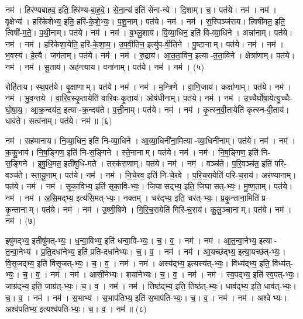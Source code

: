नम॑। हिर॑ण्यबाहव॒ इति॒ हिर॑ण्य-बा॒ह॒वे॒। से॒ना॒न्य॑ इति॑ सेना-न्ये। दि॒शाम्। च॒। पत॑ये। नम॑। 
नम॑। वृ॒क्षेभ्य॑। हरि॑केशेभ्य॒ इति॒ हरि॑-के॒शे॒भ्यः॒। प॒शू॒नाम्। पत॑ये। नम॑। 
नम॑। स॒स्पिञ्ज॑राय। त्विषी॑मत॒ इति॒ त्विषी॑-म॒ते॒। प॒थी॒नाम्। पत॑ये। नम॑। 
नम॑। ब॒भ्लु॒शाय॑। वि॒व्या॒धिन॒ इति॑ वि-व्या॒धिने। अन्ना॑नाम्। पत॑ये। नम॑। 
नम॑। हरि॑केशा॒येति॒ हरि॑-के॒शा॒य॒। उ॒प॒वी॒तिन॒ इत्यु॑प-वी॒तिने। पु॒ष्टानाम्। पत॑ये। नम॑। 
नम॑। भ॒वस्य॑। हे॒त्यै। जग॑ताम्। पत॑ये। नम॑। 
नम॑। रु॒द्राय॑। आ॒त॒ता॒विन॒ इत्या-त॒ता॒विने। क्षेत्रा॑णाम्। पत॑ये। नम॑। 
नम॑। सू॒ताय॑। अह॑न्त्याय। वना॑नाम्। पत॑ये। नम॑। 
नम॑। (५)


रोहि॑ताय। स्थ॒पत॑ये। वृ॒क्षाणाम्। पत॑ये। नम॑। 
नम॑। म॒न्त्रिणे। वा॒णि॒जाय॑। कक्षा॑णाम्। पत॑ये। नम॑। 
नम॑। भु॒व॒न्तये। वा॒रि॒व॒स्कृ॒तायेति॑ वारिवः-कृ॒ताय॑। ओष॑धीनाम्। पत॑ये। नम॑। 
नम॑। उ॒च्चैर्घो॑षा॒येत्यु॒च्चैः-घो॒षा॒य॒। आ॒क्र॒न्दय॑त॒ इत्या-क्र॒न्दय॑ते। प॒त्ती॒नाम्। पत॑ये। नम॑। 
नम॑। कृ॒त्स्न॒वी॒तायेति॑ कृत्स्न-वी॒ताय॑। धाव॑ते। सत्व॑नाम्। पत॑ये। नम॑॥ (६)


नम॑। सह॑मानाय। नि॒व्या॒धिन॒ इति॑ नि-व्या॒धिने। आ॒व्या॒धिनी॑ना॒मित्या-व्या॒धिनी॑नाम्। पत॑ये। नम॑। 
नम॑। क॒कु॒भाय॑। नि॒ष॒ङ्गिण॒ इति॑ नि-स॒ङ्गिने। स्ते॒नानाम्। पत॑ये। नम॑। 
नम॑। नि॒ष॒ङ्गिण॒ इति॑ नि-स॒ङ्गिने। इ॒षु॒धि॒मत॒ इती॑षुधि-मते। तस्क॑राणाम्। पत॑ये। नम॑। 
नम॑। वञ्च॑ते। प॒रि॒वञ्च॑त॒ इति॑ परि-वञ्च॑ते। स्ता॒यू॒नाम्। पत॑ये। नम॑। 
नम॑। नि॒चे॒रव॒ इति॑ नि-चे॒रवे। प॒रि॒च॒रायेति॑ परि-च॒राय॑। अर॑ण्यानाम्। पत॑ये। नम॑। 
नम॑। सृ॒का॒विभ्य॒ इति॑ सृका॒वि-भ्यः॒। जिघासद्भ्य॒ इति॒ जिघासत्-भ्यः॒। मु॒ष्ण॒ताम्। पत॑ये। नम॑। 
नम॑। अ॒सि॒मद्भ्य॒ इत्य॑सि॒मत्-भ्यः॒। नक्तम्। चर॑द्भ्य॒ इति॒ चर॑त्-भ्यः॒। प्र॒कृ॒न्ताना॒मिति॑ प्र-कृ॒न्तानाम्। पत॑ये। नम॑। 
नम॑। उ॒ष्णी॒षिणे। गि॒रि॒च॒रायेति॑ गिरि-च॒राय॑। कु॒लु॒ञ्चानाम्। पत॑ये। नम॑। नम॑। (७)


इषु॑मद्भ्य॒ इतीषु॑मत्-भ्यः॒। ध॒न्वा॒विभ्य॒ इति॑ धन्वा॒वि-भ्यः॒। च॒। व॒। नम॑। 
नम॑। आ॒त॒न्वा॒नेभ्य॒ इत्या-त॒न्वा॒नेभ्य॑। प्र॒ति॒दधा॑नेभ्य॒ इति॑ प्रति-दधा॑नेभ्यः। च॒। व॒। नम॑। 
नम॑। आ॒यच्छ॑द्भ्य॒ इत्या॒यच्छ॑त्-भ्यः॒। वि॒सृ॒जद्भ्य॒ इति॑ विसृ॒जत्-भ्यः॒। च॒। व॒। नम॑। 
नम॑। अस्य॑द्भ्य॒ इत्यस्य॑त्-भ्यः॒। विध्य॑द्भ्य॒ इति॒ विध्य॑त्-भ्यः॒। च॒। व॒। नम॑। 
नम॑। आसी॑नेभ्यः। शया॑नेभ्यः। च॒। व॒। नम॑। 
नम॑। स्व॒पद्भ्य॒ इति॑ स्व॒पत्-भ्यः॒। जाग्र॑द्भ्य॒ इति॒ जाग्र॑त्-भ्यः॒। च॒। व॒। नम॑। 
नम॑। तिष्ठ॑द्भ्य॒ इति॒ तिष्ठ॑त्-भ्यः॒। धाव॑द्भ्य॒ इति॒ धाव॑त्-भ्यः॒। च॒। व॒। नम॑। 
नम॑। स॒भाभ्य॑। स॒भाप॑तिभ्य॒ इति॑ स॒भाप॑ति-भ्यः॒। च॒। व॒। नम॑। 
नम॑। अश्वेभ्यः। अश्व॑पतिभ्य॒ इत्यश्व॑पति-भ्यः॒। च॒। व॒। नम॑॥ (८)


